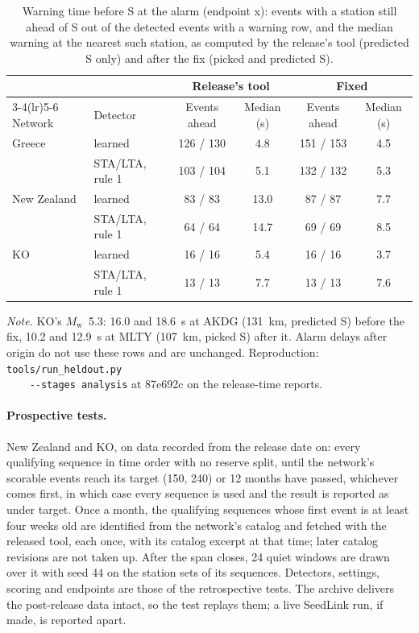 \documentclass[11pt,a4paper]{article}
\newcommand{\Mw}{$M_\mathrm{w}$}
\newcommand{\stalta}{STA/LTA}
\newcommand{\tool}[1]{\nolinkurl{#1}}
\newcommand{\tablenote}[1]{\par\vspace{4pt}%
  \begin{minipage}{\linewidth}\footnotesize\textit{Note.} #1
\end{minipage}}
\begin{document}
\begin{table}[htbp]
  \centering\small
  \caption{Warning time before S at the alarm (endpoint x): events with a station still
  ahead of S out of the detected events with a warning row, and the median warning at
  the nearest such station, as computed by the release's tool (predicted S only) and
  after the fix (picked and predicted S).}\label{t:warning}
  \setlength{\tabcolsep}{4pt}
  \begin{tabular}{@{}llcccc@{}}
    \toprule
    & & \multicolumn{2}{c}{Release's tool} & \multicolumn{2}{c}{Fixed} \\
    \cmidrule(lr){3-4}\cmidrule(lr){5-6}
    Network & Detector & Events ahead & Median (s) & Events ahead & Median (s) \\
    \midrule
    Greece & learned & 126 / 130 & 4.8 & 151 / 153 & 4.5 \\
    & \stalta{}, rule 1 & 103 / 104 & 5.1 & 132 / 132 & 5.3 \\
    New Zealand & learned & 83 / 83 & 13.0 & 87 / 87 & 7.7 \\
    & \stalta{}, rule 1 & 64 / 64 & 14.7 & 69 / 69 & 8.5 \\
    KO & learned & 16 / 16 & 5.4 & 16 / 16 & 3.7 \\
    & \stalta{}, rule 1 & 13 / 13 & 7.7 & 13 / 13 & 7.6 \\
    \bottomrule
  \end{tabular}
  \tablenote{KO's \Mw{}~5.3: 16.0 and 18.6~s at AKDG (131~km, predicted S) before the
    fix, 10.2 and 12.9~s at MLTY (107~km, picked S) after it. Alarm delays after origin
    do not use these rows and are unchanged. Reproduction: \tool{tools/run\_heldout.py
    --stages analysis} at 87e692c on the release-time reports.}
\end{table}

\paragraph{Prospective tests.} New Zealand and KO, on data recorded from the release
date on: every qualifying sequence in time order with no reserve split, until the
network's scorable events reach its target (150, 240) or 12 months have passed,
whichever comes first, in which case every sequence is used and the result is
reported as under target. Once a month, the qualifying sequences whose first event is
at least four weeks old are identified from the network's catalog and fetched with
the released tool, each once, with its catalog excerpt at that time; later catalog
revisions are not taken up. After the span closes, 24 quiet windows are drawn over it
with seed 44 on the station sets of its sequences. Detectors, settings, scoring and
endpoints are those of the retrospective tests. The archive delivers the post-release
data intact, so the test replays them; a live SeedLink run, if made, is reported
apart.
\end{document}
